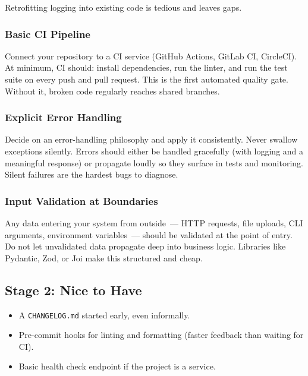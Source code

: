 Retrofitting logging into existing code is tedious and leaves gaps.

\subsubsection*{Basic CI Pipeline}\label{writing-good-code:basic-ci-pipeline}

Connect your repository to a CI service (GitHub Actions, GitLab CI, CircleCI). At minimum, CI should: install dependencies, run the linter, and run the test suite on every push and pull request. This is the first automated quality gate. Without it, broken code regularly reaches shared branches.

\subsubsection*{Explicit Error Handling}\label{writing-good-code:explicit-error-handling}

Decide on an error-handling philosophy and apply it consistently. Never swallow exceptions silently. Errors should either be handled gracefully (with logging and a meaningful response) or propagate loudly so they surface in tests and monitoring. Silent failures are the hardest bugs to diagnose.

\subsubsection*{Input Validation at Boundaries}\label{writing-good-code:input-validation-at-boundaries}

Any data entering your system from outside~--- HTTP requests, file uploads, CLI arguments, environment variables~--- should be validated at the point of entry. Do not let unvalidated data propagate deep into business logic. Libraries like Pydantic, Zod, or Joi make this structured and cheap.

\subsection*{Stage 2: Nice to Have}\label{writing-good-code:stage-2-nice-to-have}

\begin{itemize}
\tightlist
\item
  A \texttt{CHANGELOG.md} started early, even informally.
\item
  Pre-commit hooks for linting and formatting (faster feedback than waiting for CI).
\item
  Basic health check endpoint if the project is a service.
\end{itemize}

